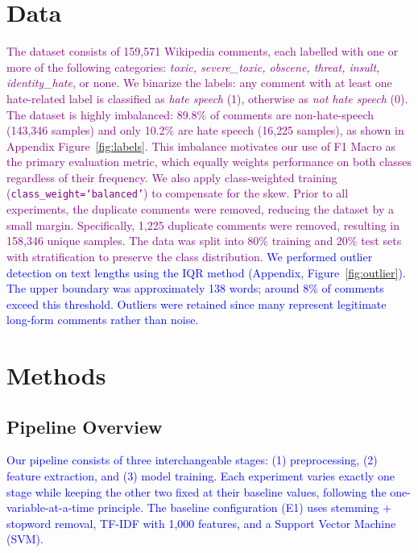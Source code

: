 \documentclass[11pt,a4paper,twocolumn]{article}
\newcommand{\authorone}[1]{\textcolor{blue}{#1}}      %
\newcommand{\joint}[1]{\textcolor{purple}{#1}}        %
\begin{document}
\section{Data}

\joint{
The dataset consists of 159{,}571 Wikipedia comments, each labelled with one or more of the following categories: \textit{toxic, severe\_toxic, obscene, threat, insult, identity\_hate}, or none. 
We binarize the labels: any comment with at least one hate-related label is classified as \textit{hate speech} (1), otherwise as \textit{not hate speech} (0).\newline
The dataset is highly imbalanced: 89.8\% of comments are non-hate-speech (143{,}346 samples) and only 10.2\% are hate speech (16{,}225 samples), as shown in Appendix Figure~\ref{fig:labels}.
This imbalance motivates our use of F1 Macro as the primary evaluation metric, which equally weights performance on both classes regardless of their frequency.
We also apply class-weighted training (\texttt{class\_weight=`balanced'}) to compensate for the skew.\newline
Prior to all experiments, the duplicate comments were removed, reducing the dataset by a small margin. Specifically, 1,225 duplicate comments were removed, resulting in 158,346 unique samples.
The data was split into 80\% training and 20\% test sets with stratification to preserve the class distribution. 
}\authorone{
We performed outlier detection on text lengths using the IQR method (Appendix, Figure~\ref{fig:outlier}). The upper boundary was approximately 138 words; around 8\% of comments exceed this threshold. Outliers were retained since many represent legitimate long-form comments rather than noise.
}

\section{Methods}

\subsection{Pipeline Overview}

\authorone{
Our pipeline consists of three interchangeable stages: (1) preprocessing,
(2) feature extraction, and (3) model training.
Each experiment varies exactly one stage while keeping the other two fixed
at their baseline values, following the one-variable-at-a-time principle.
The baseline configuration (E1) uses stemming + stopword removal, TF-IDF
with 1{,}000 features, and a Support Vector Machine (SVM).
}
\end{document}
